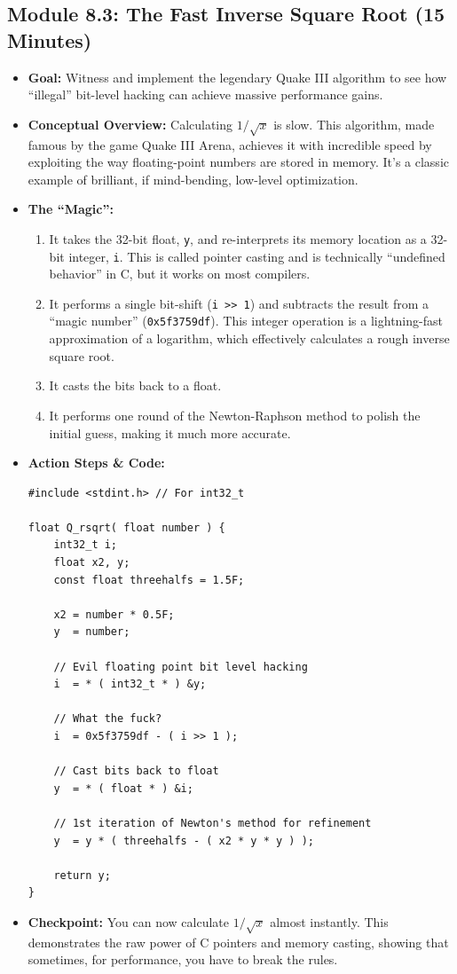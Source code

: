 \documentclass[11pt,a4paper]{article}
\begin{document}
\subsection*{Module 8.3: The Fast Inverse Square Root (15 Minutes)}

\begin{itemize}
    \item \textbf{Goal:} Witness and implement the legendary Quake III algorithm to see how ``illegal'' bit-level hacking can achieve massive performance gains.
    \item \textbf{Conceptual Overview:} Calculating $1/\sqrt{x}$ is slow. This algorithm, made famous by the game Quake III Arena, achieves it with incredible speed by exploiting the way floating-point numbers are stored in memory. It's a classic example of brilliant, if mind-bending, low-level optimization.
    \item \textbf{The ``Magic'':}
    \begin{enumerate}
        \item It takes the 32-bit float, \verb|y|, and re-interprets its memory location as a 32-bit integer, \verb|i|. This is called pointer casting and is technically ``undefined behavior'' in C, but it works on most compilers.
        \item It performs a single bit-shift (\verb|i >> 1|) and subtracts the result from a ``magic number'' (\verb|0x5f3759df|). This integer operation is a lightning-fast approximation of a logarithm, which effectively calculates a rough inverse square root.
        \item It casts the bits back to a float.
        \item It performs one round of the Newton-Raphson method to polish the initial guess, making it much more accurate.
    \end{enumerate}
    \item \textbf{Action Steps \& Code:}
\begin{lstlisting}[caption={Code for Module 8.3: Fast Inverse Square Root}]
#include <stdint.h> // For int32_t

float Q_rsqrt( float number ) {
    int32_t i;
    float x2, y;
    const float threehalfs = 1.5F;

    x2 = number * 0.5F;
    y  = number;
    
    // Evil floating point bit level hacking
    i  = * ( int32_t * ) &y;
    
    // What the fuck?
    i  = 0x5f3759df - ( i >> 1 );
    
    // Cast bits back to float
    y  = * ( float * ) &i;
    
    // 1st iteration of Newton's method for refinement
    y  = y * ( threehalfs - ( x2 * y * y ) );
    
    return y;
}
\end{lstlisting}
    \item \textbf{Checkpoint:} You can now calculate $1/\sqrt{x}$ almost instantly. This demonstrates the raw power of C pointers and memory casting, showing that sometimes, for performance, you have to break the rules.
\end{itemize}
\end{document}
